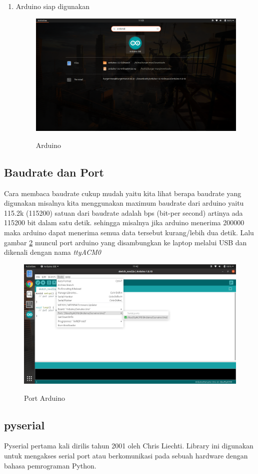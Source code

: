 \begin{enumerate}
\item Arduino siap digunakan
\begin{figure}[H]
\centering
\caption{Arduino}
\includegraphics[width=1\textwidth]{figures/7.png}
\label{arduino}
\end{figure}
\end{enumerate}

\subsection{Baudrate dan Port}
Cara membaca baudrate cukup mudah yaitu kita lihat berapa baudrate yang digunakan misalnya kita menggunakan maximum baudrate dari arduino yaitu 115.2k (115200) satuan dari baudrate adalah bps (bit-per second) artinya ada 115200 bit dalam satu detik. sehingga misalnya jika arduino menerima 200000 maka arduino dapat menerima semua data tersebut kurang/lebih dua detik. Lalu gambar \ref{portarduino} muncul port arduino yang disambungkan ke laptop melalui USB dan dikenali dengan nama \textit{ttyACM0}

\begin{figure}
\centering
\caption{Port Arduino}
\includegraphics[width=1\textwidth]{figures/8.png}
\label{portarduino}
\end{figure}

\subsection{pyserial}
Pyserial pertama kali dirilis tahun 2001 oleh Chris Liechti. Library ini digunakan untuk mengakses serial port atau berkomunikasi pada sebuah hardware dengan bahasa pemrograman Python.